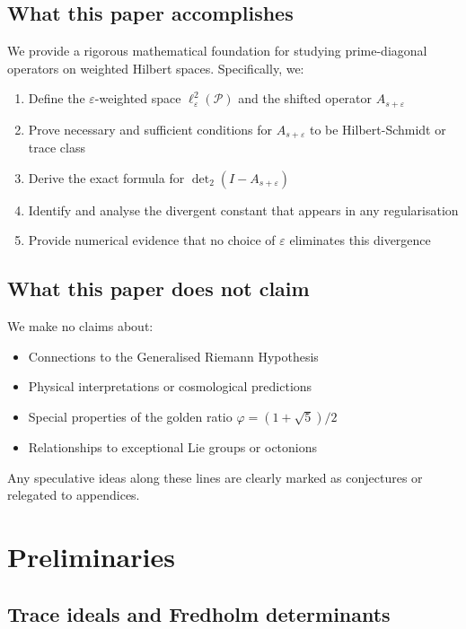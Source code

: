 \documentclass[11pt,a4paper]{article}
\theoremstyle{definition}
\theoremstyle{remark}
\newcommand{\calP}{\mathcal{P}}
\DeclareMathOperator{\det}{det}
\begin{document}
\subsection{What this paper accomplishes}

We provide a rigorous mathematical foundation for studying prime-diagonal operators 
on weighted Hilbert spaces. Specifically, we:

\begin{enumerate}
\item Define the $\varepsilon$-weighted space $\ell^2_\varepsilon(\calP)$ and the 
      shifted operator $A_{s+\varepsilon}$
\item Prove necessary and sufficient conditions for $A_{s+\varepsilon}$ to be 
      Hilbert-Schmidt or trace class
\item Derive the exact formula for $\det_2(I - A_{s+\varepsilon})$
\item Identify and analyse the divergent constant that appears in any regularisation
\item Provide numerical evidence that no choice of $\varepsilon$ eliminates this divergence
\end{enumerate}

\subsection{What this paper does not claim}

We make no claims about:
\begin{itemize}
\item Connections to the Generalised Riemann Hypothesis
\item Physical interpretations or cosmological predictions
\item Special properties of the golden ratio $\varphi = (1+\sqrt{5})/2$
\item Relationships to exceptional Lie groups or octonions
\end{itemize}

Any speculative ideas along these lines are clearly marked as conjectures or 
relegated to appendices.

\section{Preliminaries}\label{sec:prelim}

\subsection{Trace ideals and Fredholm determinants}
\end{document}
